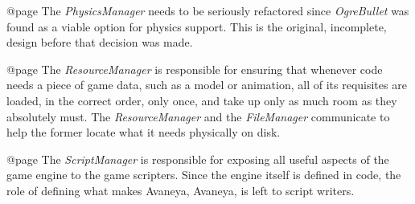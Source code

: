 @page 
The {\it PhysicsManager} needs to be seriously refactored since {\it OgreBullet} was found as a viable option for physics support. This is the original, incomplete, design before that decision was made.

    {}

@page 
The {\it ResourceManager} is responsible for ensuring that whenever code needs a piece of game data, such as a model or animation, all of its requisites are loaded, in the correct order, only once, and take up only as much room as they absolutely must. The {\it ResourceManager} and the {\it FileManager} communicate to help the former locate what it needs physically on disk.

    {}

@page 
The {\it ScriptManager} is responsible for exposing all useful aspects of the game engine to the game scripters. Since the engine itself is defined in code, the role of defining what makes Avaneya, Avaneya, is left to script writers.

    {}


